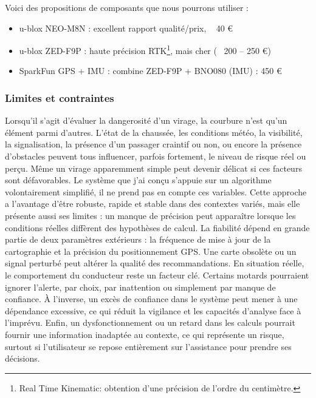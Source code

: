 Voici des propositions de composants que nous pourrons utiliser : 
\begin{itemize}
  \item u-blox NEO-M8N : excellent rapport qualité/prix, ~ 40 €
  \item u-blox ZED-F9P : haute précision RTK\footnote{Real Time Kinematic: obtention d'une précision de l’ordre du centimètre.}, mais cher (~ 200 – 250 €)
  \item SparkFun GPS + IMU : combine ZED-F9P + BNO080 (IMU) : 450 €
\end{itemize}
\vspace{0.5cm}



\subsubsection{Limites et contraintes}
Lorsqu’il s’agit d’évaluer la dangerosité d’un virage, la courbure n’est qu’un élément parmi d’autres. L’état de la chaussée, les conditions météo, la visibilité, la signalisation, la présence d'un passager craintif ou non, ou encore la présence d’obstacles peuvent tous influencer, parfois fortement, le niveau de risque réel ou perçu. Même un virage apparemment simple peut devenir délicat si ces facteurs sont défavorables.
Le système que j’ai conçu s’appuie sur un algorithme volontairement simplifié, il ne prend pas en compte ces variables. Cette approche a l’avantage d’être robuste, rapide et stable dans des contextes variés, mais elle présente aussi ses limites : un manque de précision peut apparaître lorsque les conditions réelles diffèrent des hypothèses de calcul. La fiabilité dépend en grande partie de deux paramètres extérieurs : la fréquence de mise à jour de la cartographie et la précision du positionnement GPS. Une carte obsolète ou un signal perturbé peut altérer la qualité des recommandations.
En situation réelle, le comportement du conducteur reste un facteur clé. Certains motards pourraient ignorer l’alerte, par choix, par inattention ou simplement par manque de confiance. À l’inverse, un excès de confiance dans le système peut mener à une dépendance excessive, ce qui réduit la vigilance et les capacités d’analyse face à l’imprévu.
Enfin, un dysfonctionnement ou un retard dans les calculs pourrait fournir une information inadaptée au contexte, ce qui représente un risque, surtout si l’utilisateur se repose entièrement sur l’assistance pour prendre ses décisions.
\vspace{0.5cm}

